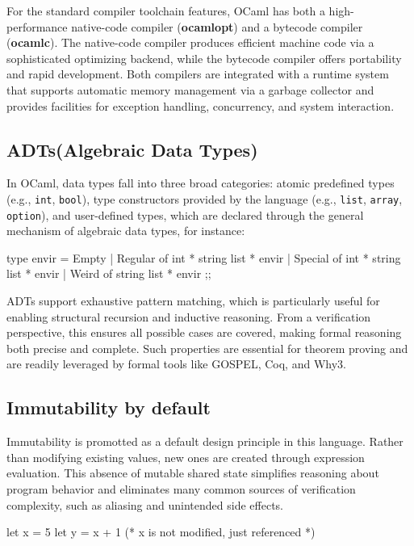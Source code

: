 For the standard compiler toolchain features, OCaml has both a high-performance native-code compiler (\textbf{ocamlopt}) and a 
bytecode compiler (\textbf{ocamlc}). The native-code compiler produces efficient machine code via a sophisticated optimizing 
backend, while the bytecode compiler offers portability and rapid development. Both compilers are integrated with a runtime 
system that supports automatic memory management via a garbage collector and provides facilities for exception handling, 
concurrency, and system interaction.



\subsection{ADTs(Algebraic Data Types)}

In OCaml, data types fall into three broad categories: atomic predefined types (e.g., \texttt{int}, \texttt{bool}), type 
constructors provided by the language (e.g., \texttt{list}, \texttt{array}, \texttt{option}), and user-defined types, which 
are declared through the general mechanism of algebraic data types, for instance:

\begin{ocamlenv}
  type envir = Empty
    | Regular of int * string list * envir
    | Special of int * string list * envir
    | Weird of string list * envir ;;
\end{ocamlenv}

ADTs support exhaustive pattern matching, which is particularly useful for enabling structural recursion and inductive reasoning.
From a verification perspective, this ensures all possible cases are covered, making formal reasoning both precise and complete. 
Such properties are essential for theorem proving and are readily leveraged by formal tools like GOSPEL, Coq, and Why3.

\subsection{Immutability by default}

Immutability is promotted as a default design principle in this language. Rather than modifying existing values, new ones 
are created through expression evaluation. This absence of mutable shared state simplifies reasoning about program behavior 
and eliminates many common sources of verification complexity, such as aliasing and unintended side effects.

\begin{ocamlenv}
  let x = 5
  let y = x + 1 (* x is not modified, just referenced *)
\end{ocamlenv}

